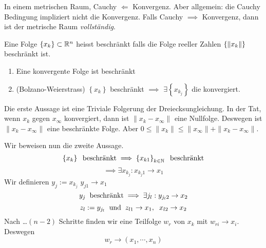 \begin{Bem}
  In einem metrischen Raum, Cauchy $\Leftarrow$ Konvergenz. Aber allgemein: die Cauchy Bedingung impliziert nicht die Konvergenz. Falls Cauchy $\implies$ Konvergenz, dann ist der metrische Raum {\em vollständig}.
\end{Bem}
\begin{Def}
  Eine Folge $\left\{ x_k \right\}\subset\mathbb{R}^n$ heisst beschränkt falls die Folge reeller Zahlen $\{\left\| x_k \right\|\}$ beschränkt ist.
\end{Def}
\begin{Sat}
  \begin{enumerate}
    \item Eine konvergente Folge ist beschränkt
    \item (Bolzano-Weierstrass) $\left\{ x_k \right\}$ beschränkt $\implies$ $\exists \left\{ x_{k_j} \right\}$ die konvergiert.
  \end{enumerate}
\end{Sat}
\begin{Bew} Die erste Aussage ist eine Triviale Folgerung der Dreiecksungleichung. In der Tat, wenn $x_k$ gegen 
$x_\infty$ konvergiert, dann ist $\|x_k-x_\infty\|$ eine Nullfolge. Deswegen ist $\|x_k-x_\infty\|$ eine beschr\"ankte
Folge. Aber $0\leq \|x_k\|\leq \|x_\infty\|+\|x_k-x_\infty\|$.

Wir beweisen nun die zweite Aussage.
  \[\left\{ x_k \right\}\hspace{2mm}\text{beschränkt}\implies \left\{ x_{k1} \right\}_{k\in\mathbb{N}}\hspace{2mm}\text{beschränkt}\]
  \[\implies \exists x_{k_j}: x_{k_j1}\to x_1\]
Wir definieren $y_j:=x_{k_j}$ $y_{j1}\to x_1$
  \[y_j\hspace{2mm}\text{beschränkt}\implies\exists j_l: y_{j_l2}\rightarrow x_2\]
  \[z_l:=y_{j_l}\hspace{2mm}\text{und}\hspace{2mm} z_{l1}\rightarrow x_1, \hspace{2mm} x_{l2}\rightarrow x_2\]
Nach  \ldots $(n-2)$ Schritte finden wir eine Teilfolge $w_r$ von $x_k$ mit $w_{ri}\to x_i$. 
Deswegen
  \[w_r\to(x_1,\cdots,x_n)\]
\end{Bew}
